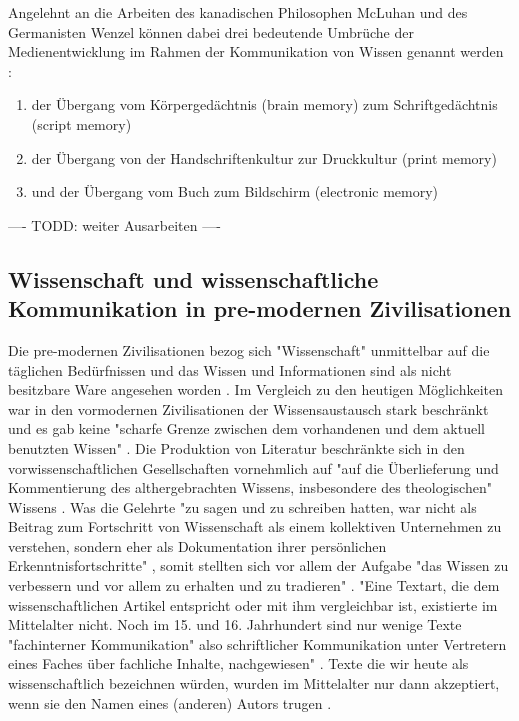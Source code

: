 Angelehnt an die Arbeiten des kanadischen Philosophen McLuhan und des Germanisten Wenzel können dabei drei bedeutende Umbrüche der Medienentwicklung im Rahmen der Kommunikation von Wissen genannt werden \cite{wunderlich_2008_buchdruck} \cite{wenzel_mediengeschichte_2007}:
\begin{enumerate}
\item der Übergang vom Körpergedächtnis (brain memory) zum Schriftgedächtnis (script memory)
\item der Übergang von der Handschriftenkultur zur Druckkultur (print memory)
\item und der Übergang vom Buch zum Bildschirm (electronic memory)
\end{enumerate}

---- TODD: weiter Ausarbeiten ----

\subsection{Wissenschaft und wissenschaftliche Kommunikation in pre-modernen Zivilisationen}

Die pre-modernen Zivilisationen bezog sich "Wissenschaft" unmittelbar auf die täglichen Bedürfnissen und das Wissen und Informationen sind als nicht besitzbare Ware angesehen worden\cite{cite:18} \cite{steiner_1998_autorenhonorar}. Im Vergleich zu den heutigen Möglichkeiten war in den vormodernen Zivilisationen der Wissensaustausch stark beschränkt \cite{cite:17c} und es gab keine "scharfe Grenze zwischen dem vorhandenen und dem aktuell benutzten Wissen" \cite{Luhmann1998}. Die Produktion von Literatur beschränkte sich in den vorwissenschaftlichen Gesellschaften vornehmlich auf "auf die Überlieferung und Kommentierung des althergebrachten Wissens, insbesondere des theologischen" Wissens \cite{steiner_1998_autorenhonorar}. Was die Gelehrte "zu sagen und zu schreiben hatten, war nicht als Beitrag zum Fortschritt von Wissenschaft als einem kollektiven Unternehmen zu verstehen, sondern eher als Dokumentation ihrer persönlichen Erkenntnisfortschritte" \cite{graefen2007_wissenschaftliche_artikel}, somit stellten sich vor allem der Aufgabe "das Wissen zu verbessern und vor allem zu erhalten und zu tradieren" \cite{Luhmann1998}. "Eine Textart, die dem wissenschaftlichen Artikel entspricht oder mit ihm vergleichbar ist, existierte im Mittelalter nicht. Noch im 15. und 16. Jahrhundert sind nur wenige Texte "fachinterner Kommunikation" also schriftlicher Kommunikation unter Vertretern eines Faches über fachliche Inhalte, nachgewiesen" \cite{graefen2007_wissenschaftliche_artikel}. Texte die wir heute als wissenschaftlich bezeichnen würden, wurden im Mittelalter nur dann akzeptiert, wenn sie den Namen eines (anderen) Autors trugen \cite{foucault_2000_autor}.

